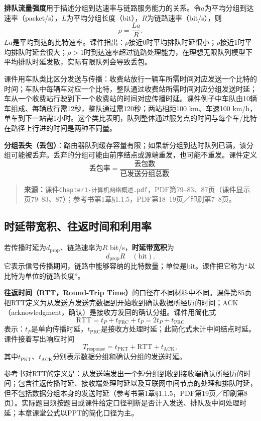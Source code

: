 \textbf{排队流量强度}用于描述分组到达速率与链路服务能力的关系。令$a$为平均分组到达速率（packet/s），$L$为平均分组长度（bit），$R$为链路速率（bit/s），则
\[
\rho=\frac{La}{R}.
\]
$La$是平均到达的比特速率。课件指出：$\rho$接近0时平均排队时延很小；$\rho$接近1时平均排队时延会很大；$\rho>1$时到达速率超过链路处理能力，在理想无限队列模型下平均排队时延发散，实际有限队列会导致丢包。

课件用车队类比区分发送与传播：收费站放行一辆车所需时间对应发送一个比特的时间；车队中每辆车对应一个比特，整队通过收费站所需时间对应分组发送时延；车从一个收费站行驶到下一个收费站的时间对应传播时延。课件例子中车队由10辆车组成、每辆放行需12秒，整队通过需120秒；两站相距100 km、车速100 km/h，单车到下一站需1小时。这个类比表明，队列整体通过服务点的时间与每个车/比特在路径上行进的时间是两种不同量。

\textbf{分组丢失（丢包）}：路由器队列缓存容量有限；如果新分组到达时队列已满，该分组可能被丢弃。丢弃的分组可能由前序结点或源端重发，也可能不重发。课件定义
\[
\text{丢包率}=\frac{\text{丢包数}}{\text{已发送分组总数}}.
\]

\begin{quote}\small\textbf{来源：}课件\texttt{Chapter1-计算机网络概述.pdf}，PDF第79--83、87页（课件显示页79--83、87）；参考书第1章§1.1.5，PDF第18--19页／印刷第7--8页。\end{quote}
\annotationarea[4]

\subsection{时延带宽积、往返时间和利用率}

若传播时延为$d_{\mathrm{prop}}$、链路速率为$R$ bit/s，\textbf{时延带宽积}为
\[
  d_{\mathrm{prop}}R\quad(\text{bit}).
\]
它表示信号传播期间，链路中能够容纳的比特数量；单位是bit。课件把它称为“以比特为单位的链路长度”。

\textbf{往返时间（RTT，Round-Trip Time）}的口径在不同材料中不同。课件第85页把RTT定义为从发送方发送完数据到开始收到确认数据所经历的时间；ACK（acknowledgment，确认）是接收方发回的确认分组。课件用简化式
\[
\mathrm{RTT}=t_P+t_{\mathrm{PRC}}+t_P=2t_P+t_{\mathrm{PRC}}
\]
表示：$t_P$是单向传播时延，$t_{\mathrm{PRC}}$是接收方处理时延；此简化式未计中间结点时延。课件接着写出响应时间
\[
T_{\mathrm{response}}=t_{\mathrm{PKT}}+\mathrm{RTT}+t_{\mathrm{ACK}},
\]
其中$t_{\mathrm{PKT}}$、$t_{\mathrm{ACK}}$分别表示数据分组和确认分组的发送时延。

参考书对RTT的定义是：从发送端发出一个短分组到收到接收端确认所经历的时间；包含往返传播时延、接收端处理时延以及互联网中间节点的处理和排队时延，但不包括数据分组本身的发送时延（参考书第1章§1.1.5，PDF第19页／印刷第8页）。实际题目须按题目或课件给定口径判断是否计入发送、排队及中间处理时延；本章课堂公式以PPT的简化口径为主。

